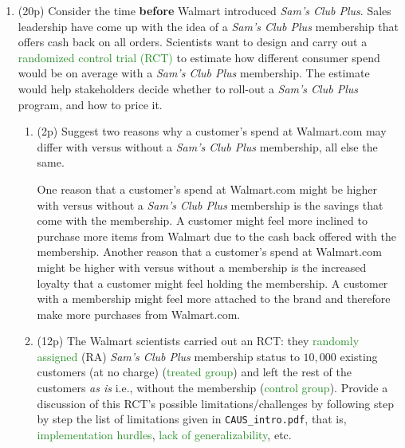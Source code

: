 \documentclass{article}
\begin{document}
\begin{enumerate}[label=\textbf{Q\arabic{enumi}}.,ref=Q\arabic{enumi}, wide=0pt, itemsep=1em, topsep=5pt]

        \item (20p) Consider the time \textbf{before} Walmart introduced \textit{Sam's Club Plus}. Sales leadership have come up with the idea of a \textit{Sam's Club Plus} membership that offers cash back on all orders. Scientists want to design and carry out a \textcolor{ForestGreen}{randomized control trial (RCT)} to estimate how different consumer spend would be on average with a \textit{Sam's Club Plus} membership. The estimate would help stakeholders decide whether to roll-out a \textit{Sam's Club Plus} program, and how to price it. \label{item:q2}
        \begin{enumerate}

        \item (2p) Suggest two reasons why a customer's spend at Walmart.com may differ with versus without a \textit{Sam's Club Plus} membership, all else the same.

        \begin{solution}
            {
                One reason that a customer's spend at Walmart.com might be higher with versus without a \textit{Sam's Club Plus} membership is the savings that come with the membership. A customer might feel more inclined to purchase more items from Walmart due to the cash back offered with the membership. Another reason that a customer's spend at Walmart.com might be higher with versus without a membership is the increased loyalty that a customer might feel holding the membership. A customer with a membership might feel more attached to the brand and therefore make more purchases from Walmart.com.
            }
        \end{solution}

        \item (12p) The Walmart scientists carried out an RCT: they \textcolor{ForestGreen}{randomly assigned} (RA) \textit{Sam's Club Plus} membership status to $10,000$ existing customers (at no charge) (\textcolor{ForestGreen}{treated group}) and left the rest of the customers \textit{as is} i.e., without the membership (\textcolor{ForestGreen}{control group}). Provide a discussion of this RCT's possible limitations/challenges by following step by step the list of limitations given in \texttt{CAUS\_intro.pdf}, that is, \textcolor{ForestGreen}{implementation hurdles}, \textcolor{ForestGreen}{lack of generalizability}, etc.


\end{enumerate}
\end{enumerate}
\end{document}
